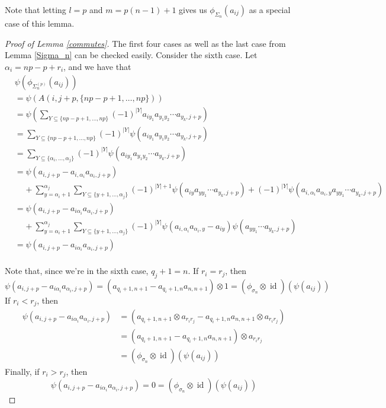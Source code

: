 \documentclass[11pt]{amsart}
\def\s{{\sigma}}
\def\a{\alpha}
\newcommand\id{\operatorname{id}}
\newcommand\Sp{\Sigma^{(p)}}
\begin{document}
\noindent Note that letting $l=p$ and $m=p(n-1) + 1$ gives us $\phi_{\Sigma_n}(a_{ij})$ as a special case of this lemma.



\begin{proof} [Proof of Lemma \ref{commutes}]
The first four cases as well as the last case from Lemma \ref{Sigma_n} can be checked easily.  Consider the sixth case.  Let $\a_i  = np-p+r_i$, and we have that
\begin{align*}
&\psi\left(\phi_{\Sp_n}(a_{ij})\right) \\
&= \psi\left(A(i,j+p,\{np-p+1,\ldots,np\})\right)\\
&= \psi\left(\sum_{Y\subseteq \{np-p+1,\ldots,np\}}(-1)^{|Y|}a_{iy_1}a_{y_1y_2}\cdots a_{y_k,j+p}\right)\\
&= \sum_{Y\subseteq \{np-p+1,\ldots,np\}}(-1)^{|Y|}\psi\left(a_{iy_1}a_{y_1y_2}\cdots a_{y_k,j+p}\right)\\
&= \sum_{Y\subseteq \{\a_i,\ldots,\a_j\}}(-1)^{|Y|}\psi\left(a_{iy_1}a_{y_1y_2}\cdots a_{y_k,j+p}\right)\\
&= \psi\left(a_{i,j+p} - a_{i,\a_i}a_{\a_i,j+p}\right)\\
& \;\;\;\;+ \sum_{y=\a_i+1}^{\a_j}\sum_{Y\subseteq \{y+1,\ldots,\a_j\}}(-1)^{|Y|+1}\psi\left(a_{iy}a_{yy_1}\cdots a_{y_k,j+p}\right) + (-1)^{|Y|}\psi\left(a_{i,\a_i}a_{\a_i,y}a_{yy_1}\cdots a_{y_k,j+p}\right)\\
&= \psi\left(a_{i,j+p} - a_{i\a_i}a_{\a_i,j+p}\right)\\
& \;\;\;\;+ \sum_{y=\a_i+1}^{\a_j}\sum_{Y\subseteq \{y+1,\ldots,\a_j\}}(-1)^{|Y|}\psi\left(a_{i,\a_i}a_{\a_i,y} - a_{iy}\right)\psi\left(a_{yy_1}\cdots a_{y_k,j+p}\right)\\
&= \psi\left(a_{i,j+p} - a_{i\a_i}a_{\a_i,j+p}\right)\\
\end{align*}

\noindent Note that, since we're in the sixth case, $q_j + 1 = n$.  If $r_i = r_j$, then 
$$\psi\left(a_{i,j+p} - a_{i\a_i}a_{\a_i,j+p}\right) = \left(a_{q_i+1,n+1} - a_{q_i+1,n}a_{n,n+1}\right)\otimes 1 = (\phi_{\s_n} \otimes \id)(\psi(a_{ij}))$$
If $r_i < r_j$, then
\begin{align*}
\psi\left(a_{i,j+p} - a_{i\a_i}a_{\a_i,j+p}\right) &= \left(a_{q_i+1,n+1}\otimes a_{r_ir_j} - a_{q_i+1,n}a_{n,n+1}\otimes a_{r_ir_j}\right)\\
&= \left(a_{q_i+1,n+1} - a_{q_i+1,n}a_{n,n+1}\right)\otimes a_{r_ir_j}\\
&= (\phi_{\s_n} \otimes \id)(\psi(a_{ij}))
\end{align*}
Finally, if $r_i > r_j$, then
$$\psi\left(a_{i,j+p} - a_{i\a_i}a_{\a_i,j+p}\right) = 0 = (\phi_{\s_n} \otimes \id)(\psi(a_{ij}))$$


\end{proof}
\end{document}
